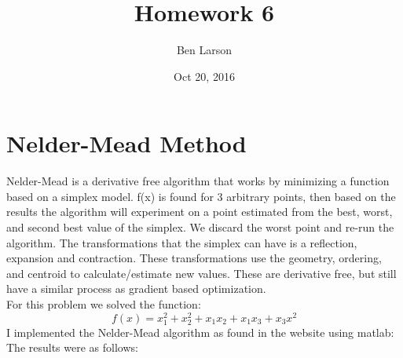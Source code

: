 \documentclass[7pt]{article}
\author{Ben Larson}
\title{Homework 6 }
\date{Oct 20, 2016}
\begin{document}
	\maketitle
	\section{Nelder-Mead Method}
	Nelder-Mead is a derivative free algorithm that works by minimizing a function based on a simplex model. f(x) is found for 3 arbitrary points, then based on the results the algorithm will experiment on a point estimated from the best, worst, and second best value of the simplex. We discard the worst point and re-run the algorithm. The transformations that the simplex can have is a reflection, expansion and contraction. These transformations use the geometry, ordering, and centroid to calculate/estimate new values. These are derivative free, but still have a similar process as gradient based optimization. \\
	For this problem we solved the function:
	$$ f(x) = x_1^2+x_2^2+x_1x_2+x_1x_3+x_3x^2 $$
	I implemented the Nelder-Mead algorithm as found in the website using matlab: 
	The results were as follows: 
	\noindent%
	\begin{minipage}{\linewidth}%
		\label{visina8}%
	\end{minipage}
\end{document}
